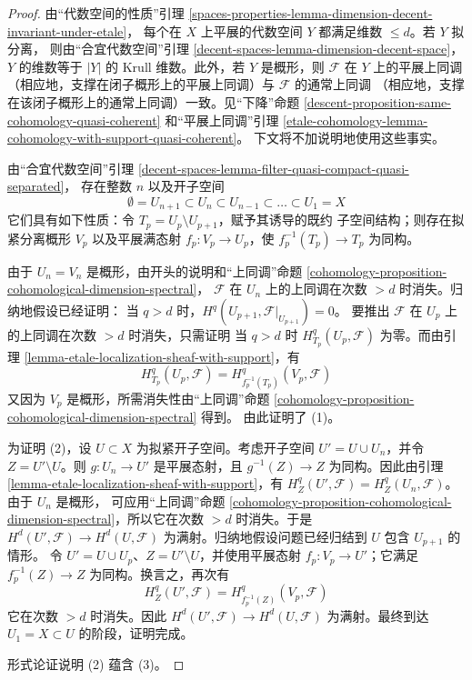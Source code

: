 \begin{proof}
由“代数空间的性质”引理
\ref{spaces-properties-lemma-dimension-decent-invariant-under-etale}，
每个在 $X$ 上平展的代数空间 $Y$ 都满足维数 $\leq d$。若 $Y$ 拟分离，
则由“合宜代数空间”引理
\ref{decent-spaces-lemma-dimension-decent-space}，$Y$ 的维数等于 $|Y|$ 的
Krull 维数。此外，若 $Y$ 是概形，则 $\mathcal{F}$ 在 $Y$ 上的平展上同调
（相应地，支撑在闭子概形上的平展上同调）与 $\mathcal{F}$ 的通常上同调
（相应地，支撑在该闭子概形上的通常上同调）一致。见“下降”命题
\ref{descent-proposition-same-cohomology-quasi-coherent} 和“平展上同调”引理
\ref{etale-cohomology-lemma-cohomology-with-support-quasi-coherent}。
下文将不加说明地使用这些事实。

\medskip\noindent
由“合宜代数空间”引理
\ref{decent-spaces-lemma-filter-quasi-compact-quasi-separated}，
存在整数 $n$ 以及开子空间
$$
\emptyset = U_{n + 1} \subset
U_n \subset U_{n - 1} \subset \ldots \subset U_1 = X
$$
它们具有如下性质：令 $T_p = U_p \setminus U_{p + 1}$，赋予其诱导的既约
子空间结构；则存在拟紧分离概形 $V_p$ 以及平展满态射
$f_p : V_p \to U_p$，使 $f_p^{-1}(T_p) \to T_p$ 为同构。

\medskip\noindent
由于 $U_n = V_n$ 是概形，由开头的说明和“上同调”命题
\ref{cohomology-proposition-cohomological-dimension-spectral}，
$\mathcal{F}$ 在 $U_n$ 上的上同调在次数 $> d$ 时消失。归纳地假设已经证明：
当 $q > d$ 时，$H^q(U_{p + 1}, \mathcal{F}|_{U_{p + 1}}) = 0$。
要推出 $\mathcal{F}$ 在 $U_p$ 上的上同调在次数 $> d$ 时消失，只需证明
当 $q > d$ 时 $H_{T_p}^q(U_p, \mathcal{F})$ 为零。而由引理
\ref{lemma-etale-localization-sheaf-with-support}，有
$$
H^q_{T_p}(U_p, \mathcal{F}) = H^q_{f_p^{-1}(T_p)}(V_p, \mathcal{F})
$$
又因为 $V_p$ 是概形，所需消失性由“上同调”命题
\ref{cohomology-proposition-cohomological-dimension-spectral} 得到。
由此证明了 (1)。

\medskip\noindent
为证明 (2)，设 $U \subset X$ 为拟紧开子空间。考虑开子空间
$U' = U \cup U_n$，并令 $Z = U' \setminus U$。则
$g : U_n \to U'$ 是平展态射，且 $g^{-1}(Z) \to Z$ 为同构。因此由引理
\ref{lemma-etale-localization-sheaf-with-support}，有
$H^q_Z(U', \mathcal{F}) = H^q_Z(U_n, \mathcal{F})$。由于 $U_n$ 是概形，
可应用“上同调”命题
\ref{cohomology-proposition-cohomological-dimension-spectral}，所以它在次数
$> d$ 时消失。于是 $H^d(U', \mathcal{F}) \to H^d(U, \mathcal{F})$
为满射。归纳地假设问题已经归结到 $U$ 包含 $U_{p + 1}$ 的情形。
令 $U' = U \cup U_p$、$Z = U' \setminus U$，并使用平展态射
$f_p : V_p \to U'$；它满足 $f_p^{-1}(Z) \to Z$ 为同构。换言之，再次有
$$
H^q_Z(U', \mathcal{F}) = H^q_{f_p^{-1}(Z)}(V_p, \mathcal{F})
$$
它在次数 $> d$ 时消失。因此
$H^d(U', \mathcal{F}) \to H^d(U, \mathcal{F})$ 为满射。最终到达
$U_1 = X \subset U$ 的阶段，证明完成。

\medskip\noindent
形式论证说明 (2) 蕴含 (3)。
\end{proof}








